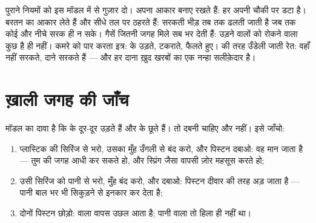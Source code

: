 \begin{example}[छह साल के नियम, एक ही व्याख्या]\label{ex:g7:states-of-matter:rules}
पुराने नियमों को इस मॉडल में से गुज़ार दो।  अपना आकार बनाए रखते
हैं: हर  अपनी चौकी पर डटा है।  बरतन का आकार लेते हैं और सीधे
तल पर ठहरते हैं: सरकती भीड़ तब तक ढलती जाती है जब तक कोई  और नीचे
सरक ही न सके। गैसें जितनी जगह मिले सब भर देती हैं: उड़ने वालों को
रोकने वाला कुछ है ही नहीं। कमरे को पार करता इत्र:  के  उड़ते,
टकराते, फैलते हुए।  की तरह उँडेली जाती रेत: वहाँ  नहीं सरकते,
दाने सरकते हैं --- और हर दाना ख़ुद खरबों  का एक नन्हा सलीक़ेदार
 है।
\end{example}

\section{ख़ाली जगह की जाँच}

\begin{method}[दो सिरिंज]\label{met:g7:states-of-matter:syringe}
मॉडल का दावा है कि  के  दूर-दूर उड़ते हैं और  के  छूते
हैं। तो  दबनी चाहिए और  नहीं। इसे जाँचो:
\begin{enumerate}
  \item प्लास्टिक की सिरिंज  से भरो, उसका मुँह उँगली से बंद करो,
        और पिस्टन दबाओ: वह मान जाता है --- तुम  की जगह आधी कर
        सकते हो, और स्प्रिंग जैसा वापसी ज़ोर महसूस करते हो;
  \item उसी सिरिंज को पानी से भरो, मुँह बंद करो, और दबाओ: पिस्टन
        दीवार की तरह अड़ जाता है --- पानी बाल भर भी सिकुड़ने से इनकार
        कर देता है;
  \item दोनों पिस्टन छोड़ो:  वाला वापस उछल आता है; पानी वाला तो
        हिला ही नहीं था।
\end{enumerate}
\end{method}

